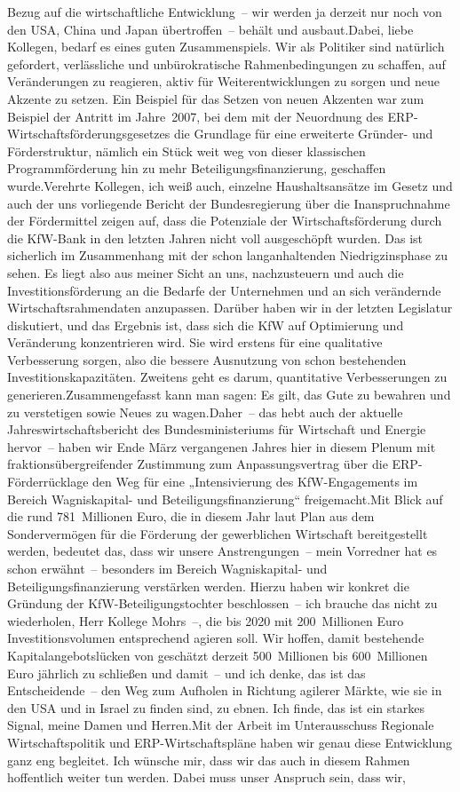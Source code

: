 \documentclass{article}
\begin{document}
Bezug auf die wirtschaftliche Entwicklung – wir werden ja derzeit nur noch von den USA, China und Japan übertroffen – behält und ausbaut.Dabei, liebe Kollegen, bedarf es eines guten Zusammenspiels. Wir als Politiker sind natürlich gefordert, verlässliche und unbürokratische Rahmenbedingungen zu schaffen, auf Veränderungen zu reagieren, aktiv für Weiterentwicklungen zu sorgen und neue Akzente zu setzen. Ein Beispiel für das Setzen von neuen Akzenten war zum Beispiel der Antritt im Jahre 2007, bei dem mit der Neuordnung des ERP-Wirtschaftsförderungsgesetzes die Grundlage für eine erweiterte Gründer- und Förderstruktur, nämlich ein Stück weit weg von dieser klassischen Programmförderung hin zu mehr Beteiligungsfinanzierung, geschaffen wurde.Verehrte Kollegen, ich weiß auch, einzelne Haushaltsansätze im Gesetz und auch der uns vorliegende Bericht der Bundesregierung über die Inanspruchnahme der Fördermittel zeigen auf, dass die Potenziale der Wirtschaftsförderung durch die KfW-Bank in den letzten Jahren nicht voll ausgeschöpft wurden. Das ist sicherlich im Zusammenhang mit der schon langanhaltenden Niedrigzinsphase zu sehen. Es liegt also aus meiner Sicht an uns, nachzusteuern und auch die Investitionsförderung an die Bedarfe der Unternehmen und an sich verändernde Wirtschaftsrahmendaten anzupassen. Darüber haben wir in der letzten Legislatur diskutiert, und das Ergebnis ist, dass sich die KfW auf Optimierung und Veränderung konzentrieren wird. Sie wird erstens für eine qualitative Verbesserung sorgen, also die bessere Ausnutzung von schon bestehenden Investitionskapazitäten. Zweitens geht es darum, quantitative Verbesserungen zu generieren.Zusammengefasst kann man sagen: Es gilt, das Gute zu bewahren und zu verstetigen sowie Neues zu wagen.Daher – das hebt auch der aktuelle Jahreswirtschaftsbericht des Bundesministeriums für Wirtschaft und Energie hervor – haben wir Ende März vergangenen Jahres hier in diesem Plenum mit fraktionsübergreifender Zustimmung zum Anpassungsvertrag über die ERP-Förderrücklage den Weg für eine „Intensivierung des KfW-Engagements im Bereich Wagniskapital- und Beteiligungsfinanzierung“ freigemacht.Mit Blick auf die rund 781 Millionen Euro, die in diesem Jahr laut Plan aus dem Sondervermögen für die Förderung der gewerblichen Wirtschaft bereitgestellt werden, bedeutet das, dass wir unsere Anstrengungen – mein Vorredner hat es schon erwähnt – besonders im Bereich Wagniskapital- und Beteiligungsfinanzierung verstärken werden. Hierzu haben wir konkret die Gründung der KfW-Beteiligungstochter beschlossen – ich brauche das nicht zu wiederholen, Herr Kollege Mohrs –, die bis 2020 mit 200 Millionen Euro Investitionsvolumen entsprechend agieren soll. Wir hoffen, damit bestehende Kapitalangebotslücken von geschätzt derzeit 500 Millionen bis 600 Millionen Euro jährlich zu schließen und damit – und ich denke, das ist das Entscheidende – den Weg zum Aufholen in Richtung agilerer Märkte, wie sie in den USA und in Israel zu finden sind, zu ebnen. Ich finde, das ist ein starkes Signal, meine Damen und Herren.Mit der Arbeit im Unterausschuss Regionale Wirtschaftspolitik und ERP-Wirtschaftspläne haben wir genau diese Entwicklung ganz eng begleitet. Ich wünsche mir, dass wir das auch in diesem Rahmen hoffentlich weiter tun werden. Dabei muss unser Anspruch sein, dass wir, 
\end{document}
